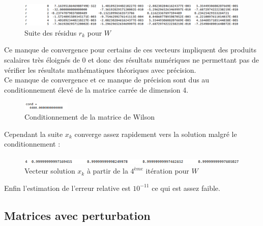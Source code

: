 \documentclass[12,french]{report}
\begin{document}
\begin{figure}[H]
	\centering
	\includegraphics[width=1\textwidth]{./Images/r_W}
	\caption{Suite des résidus $r_k$ pour $W$}
\end{figure}\vspace{0.2cm}

Ce manque de convergence pour certains de ces vecteurs impliquent des produits scalaires très éloignés de 0 et donc des résultats numériques ne permettant pas de vérifier les résultats mathématiques théoriques avec précision.\\

Ce manque de convergence et ce manque de précision sont dus au conditionnement élevé de la matrice carrée de dimension 4.\\

\begin{figure}[H]
	\centering
	\includegraphics[width=0.2\textwidth]{./Images/Conditionnement_W}
	\caption{Conditionnement de la matrice de Wilson}
\end{figure}\vspace{0.2cm}

Cependant la suite $x_k$ converge assez rapidement vers la solution malgré le conditionnement :\\

\begin{figure}[H]
	\centering
	\includegraphics[width=1\textwidth]{./Images/x_W}
	\caption{Vecteur solution $x_k$ à partir de la $4^{ème}$ itération pour $W$}
\end{figure}\vspace{0.2cm}

Enfin l'estimation de l'erreur relative est $10^{-11}$ ce qui est assez faible. 

\subsection{Matrices avec perturbation}
\end{document}
